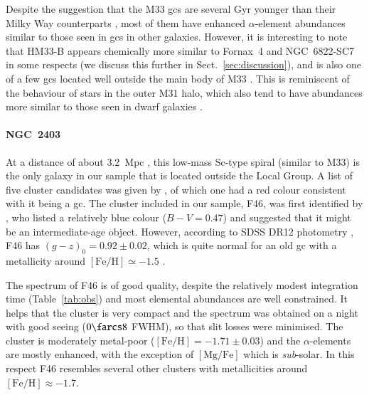 \documentclass{aa}
\begin{document}
Despite the suggestion that the M33 \acp{gc} are several Gyr younger than their Milky Way counterparts \citep{Sarajedini2000}, most of them have enhanced $\alpha$-element abundances similar to those seen in \acp{gc} in other galaxies. However, it is interesting to note that HM33-B appears chemically more similar to Fornax~4 and NGC~6822-SC7 in some respects (we discuss this further in Sect.~\ref{sec:discussion}), and is also one of a few \acp{gc} located well outside the main body of M33 \citep{Huxor2009}. This is reminiscent of the behaviour of stars in the outer M31 halo, which also tend to have abundances more similar to those seen in dwarf galaxies \citep{Gilbert2020}.

\paragraph{NGC~2403}

At a distance of about 3.2~Mpc \citep{Freedman1988,Radburn-Smith2011}, this low-mass Sc-type spiral (similar to M33) is the only galaxy in our sample that is located outside the Local Group. A list of five cluster candidates was given by \citet{Tammann1968}, of which one had a red colour consistent with it being a \ac{gc}. The cluster included in our sample, F46, was first identified by \citet{Battistini1984}, who listed a relatively blue colour ($B-V=0.47$) and suggested that it might be an intermediate-age object. However, according to SDSS DR12 photometry \citep{Alam2015}, F46 has $(g-z)_0 = 0.92\pm0.02$, which is quite normal for an old \ac{gc} with a metallicity around $\mathrm{[Fe/H]}\simeq-1.5$ \citep{Vanderbeke2013a}. 

The spectrum of F46 is of good quality, despite the relatively modest integration time (Table~\ref{tab:obs}) and most elemental abundances are well constrained. It helps that the cluster is very compact and the spectrum was obtained on a night with good seeing ($0\farcs8$ FWHM), so that slit losses were minimised. 
The cluster is moderately metal-poor ($\mathrm{[Fe/H]} = -1.71\pm0.03$) and the $\alpha$-elements are mostly enhanced, with the exception of $\mathrm{[Mg/Fe]}$ which is \emph{sub}-solar.  In this respect F46 resembles several other clusters with metallicities around $\mathrm{[Fe/H]}\approx-1.7$.
\end{document}
